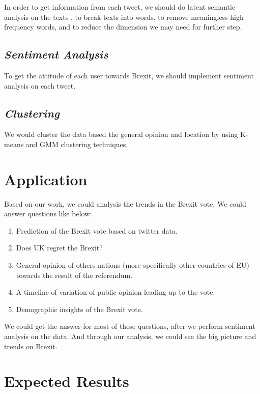 \documentclass{article}
\begin{document}
\par In order to get information from each tweet, we should do latent semantic analysis on the texts , to break texts into words, to remove meaningless high frequency words, and to reduce the dimension we may need for further step.

\subsection*{\textit{\textbf{Sentiment Analysis}}}
\par To get the attitude of each user towards Brexit, we should implement sentiment analysis on each tweet.

\subsection*{\textit{\textbf{Clustering}}}
\par We would cluster the data based the general opinion and location by using  K-means and GMM clustering techniques.

\section*{Application}
\par Based on our work, we could analysis the trends in the Brexit vote. We could answer questions like below:
\begin{enumerate}
\item Prediction of the Brexit vote based on twitter data.
\item Does UK regret the Brexit?
\item General opinion of others nations (more specifically other countries of EU) towards the result of the referendum.
\item A timeline of variation of public opinion leading up to the vote.
\item Demographic insights of the Brexit vote.
\end{enumerate}

We could get the answer for most of these questions, after we perform sentiment analysis on the data. And through our analysis, we could see the big picture and trends on Brexit.

\section*{Expected Results}
\end{document}
